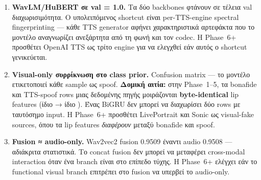 \begin{enumerate}
  \item \textbf{WavLM/HuBERT σε val \AUC{} = 1.0.}
        Τα δύο backbones φτάνουν σε τέλεια val διαχωρισιμότητα.
        Ο υπολειπόμενος shortcut είναι per-TTS-engine
        spectral fingerprinting —
        κάθε TTS generator αφήνει χαρακτηριστικά αρτεφάκτα
        που το μοντέλο αναγνωρίζει ανεξάρτητα από τη φωνή και
        τον codec.
        Η Phase~6+ προσθέτει OpenAI TTS ως τρίτο engine
        για να ελεγχθεί εάν αυτός ο shortcut γενικεύεται.

  \item \textbf{Visual-only συρρίκνωση στο class prior.}
        Confusion matrix  —
        το μοντέλο ετικετοποιεί κάθε sample ως spoof.
        \textbf{Δομική αιτία:}
        στην Phase~1–5, τα bonafide και TTS-spoof rows
        μιας δεδομένης πηγής μοιράζονται
        \textbf{byte-identical} lip features
        (ίδιο  → ίδιο ).
        Ένας BiGRU δεν μπορεί να διαχωρίσει δύο rows
        με ταυτόσημο input.
        Η Phase~6+ προσθέτει LivePortrait και Sonic
        ως visual-fake sources,
        όπου τα lip features \emph{διαφέρουν} μεταξύ bonafide και spoof.

  \item \textbf{Fusion ≈ audio-only.}
        Wav2vec2 fusion 0.9509 έναντι audio 0.9508 —
        αδιάκριτα στατιστικά.
        Το concat fusion δεν μπορεί να μεταφέρει cross-modal
        interaction όταν ένα branch είναι στο επίπεδο τύχης.
        Η Phase~6+ ελέγχει εάν το functional visual branch
        επιτρέπει στο fusion να υπερβεί το audio-only.
\end{enumerate}
